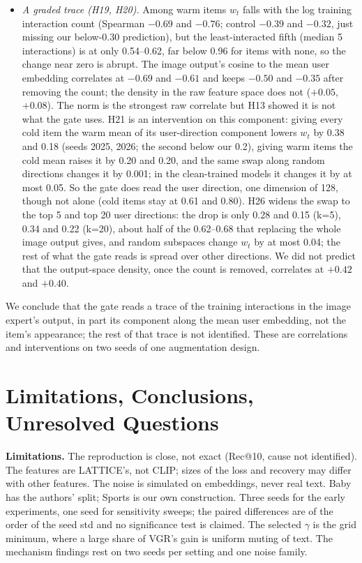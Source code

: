 \documentclass[conference]{IEEEtran}
\begin{document}
\begin{itemize}
\item \emph{A graded trace (H19, H20).} Among warm items $w_t$ falls with the log training interaction count (Spearman $-0.69$ and $-0.76$; control $-0.39$ and $-0.32$, just missing our below-0.30 prediction), but the least-interacted fifth (median 5 interactions) is at only 0.54--0.62, far below 0.96 for items with none, so the change near zero is abrupt. The image output's cosine to the mean user embedding correlates at $-0.69$ and $-0.61$ and keeps $-0.50$ and $-0.35$ after removing the count; the density in the raw feature space does not ($+0.05$, $+0.08$). The norm is the strongest raw correlate but H13 showed it is not what the gate uses. H21 is an intervention on this component: giving every cold item the warm mean of its user-direction component lowers $w_t$ by 0.38 and 0.18 (seeds 2025, 2026; the second below our 0.2), giving warm items the cold mean raises it by 0.20 and 0.20, and the same swap along random directions changes it by 0.001; in the clean-trained models it changes it by at most 0.05. So the gate does read the user direction, one dimension of 128, though not alone (cold items stay at 0.61 and 0.80). H26 widens the swap to the top 5 and top 20 user directions: the drop is only 0.28 and 0.15 (k=5), 0.34 and 0.22 (k=20), about half of the 0.62--0.68 that replacing the whole image output gives, and random subspaces change $w_t$ by at most 0.04; the rest of what the gate reads is spread over other directions. We did not predict that the output-space density, once the count is removed, correlates at $+0.42$ and $+0.40$.
\end{itemize}
We conclude that the gate reads a trace of the training interactions in the image expert's output, in part its component along the mean user embedding, not the item's appearance; the rest of that trace is not identified. These are correlations and interventions on two seeds of one augmentation design.

\section{Limitations, Conclusions, Unresolved Questions}

\textbf{Limitations.} The reproduction is close, not exact (Rec@10, cause not identified). The features are LATTICE's, not CLIP; sizes of the loss and recovery may differ with other features. The noise is simulated on embeddings, never real text. Baby has the authors' split; Sports is our own construction. Three seeds for the early experiments, one seed for sensitivity sweeps; the paired differences are of the order of the seed std and no significance test is claimed. The selected $\gamma$ is the grid minimum, where a large share of VGR's gain is uniform muting of text. The mechanism findings rest on two seeds per setting and one noise family. 
\end{document}
